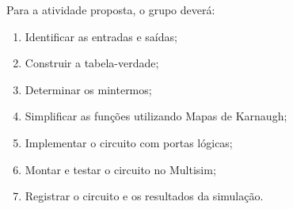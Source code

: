 \documentclass[a4paper,12pt]{article}
\begin{document}
Para a atividade proposta, o grupo deverá:

\begin{enumerate}[label=\alph*)]
    \item Identificar as entradas e saídas;
    \item Construir a tabela-verdade;
    \item Determinar os mintermos;
    \item Simplificar as funções utilizando Mapas de Karnaugh;
    \item Implementar o circuito com portas lógicas;
    \item Montar e testar o circuito no Multisim;
    \item Registrar o circuito e os resultados da simulação.
\end{enumerate}

\newpage

\end{document}
